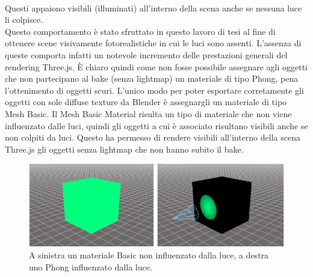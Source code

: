 \\
Questi appaiono visibili (illuminati) all’interno della scena anche se nessuna luce li colpisce.
\\
Questo comportamento è stato sfruttato in questo lavoro di tesi al fine di ottenere scene visivamente fotorealistiche in cui le luci sono assenti. L’assenza di queste comporta infatti un notevole incremento delle prestazioni generali del rendering Three.js.
È chiaro quindi come non fosse possibile assegnare agli oggetti che non partecipano al bake (senza lightmap) un materiale di tipo Phong, pena l’ottenimento di oggetti scuri.
L’unico modo per poter esportare corretamente gli oggetti con sole diffuse texture da Blender è assegnargli un materiale di tipo Mesh Basic. 
Il Mesh Basic Material risulta un tipo di materiale che non viene influenzato dalle luci, quindi gli oggetti a cui è associato risultano visibili anche se non colpiti da luci.
Questo ha permesso di rendere visibili all’interno della scena Three.js gli oggetti senza lightmap che non hanno subito il bake.
\\
\begin{figure}[htb]
 \centering
 \includegraphics[width=1\linewidth]{images/chapter_baking_service/basic_phong.png}\hfill
 \caption[Differenza tra un materiale Basic ed uno Phong.]{A sinistra un materiale Basic non influenzato dalla luce, a destra uno Phong influenzato dalla luce.}
 \label{fig:baking_service_basic_phong}
\end{figure}

